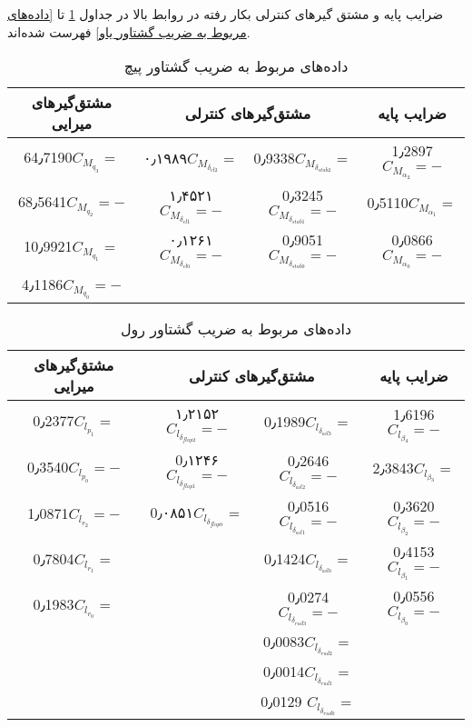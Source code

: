 ضرایب پایه و مشتق گیرهای کنترلی بکار رفته در روابط بالا در جداول \ref{داده‌های مربوط به ضریب گشتاور پیچ} تا  \ref{داده‌های مربوط به ضریب گشتاور یاو} فهرست شده‌اند.
\begin{table}
\centering%
\caption{داده‌های مربوط به ضریب گشتاور پیچ}\label{داده‌های مربوط به ضریب گشتاور پیچ}
\begin{tabular}{ |c|c|c|c| }
  \hline
  مشتق‌گیرهای میرایی & \multicolumn{2}{|c|}{مشتق‌گیرهای کنترلی}  & ضرایب پایه \\ \hline
  64٫7190$C_{M_{q_{3}}}=$ & ۰٫۱۹۸۹$C_{M_{\delta_{el2}}}=$ & 0٫9338$C_{M_{\delta_{stab2}}}=$ & 1٫2897$C_{M_{\alpha_{2}}}= -$\\
  \hline
 68٫5641$C_{M_{q_{2}}}=-$ & ۱٫۴۵۲۱$C_{M_{\delta_{el1}}}=-$ & 0٫3245$C_{M_{\delta_{stab1}}}=-$& 0٫5110$C_{M_{\alpha_{1}}}=$\\
  \hline
10٫9921$C_{M_{q_{1}}}=$& ۰٫۱۲۶۱$C_{M_{\delta_{el0}}}=-$ &0٫9051$C_{M_{\delta_{stab0}}}=-$ &0٫0866$C_{M_{\alpha_{0}}}=- $\\
  \hline
 4٫1186$C_{M_{q_{0}}}=-$& &  & $ $\\
 \hline
 \end{tabular}
\end{table}
\begin{table}
\centering%
\caption{داده‌های مربوط به ضریب گشتاور رول}\label{داده‌های مربوط به ضریب گشتاور رول}
\begin{tabular}{ |c|c|c|c| }
  \hline
  مشتق‌گیرهای میرایی & \multicolumn{2}{|c|}{مشتق‌گیرهای کنترلی}  & ضرایب پایه \\ \hline
 0٫2377$C_{l_{p_{1}}}=$ &  ۱٫۲۱۵۲$C_{l_{\delta_{flap2}}}=-$ &0٫1989$C_{l_{\delta_{ail3}}}=$ & 1٫6196$C_{l_{\beta_{4}}}= -$\\
  \hline
0٫3540$C_{l_{p_{0}}}=-$ & 0٫۱۲۴۶$C_{l_{\delta_{flap1}}}=-$ & 0٫2646$C_{l_{\delta_{ail2}}}=-$& 2٫3843$C_{l_{\beta_{3}}}=$\\
  \hline
1٫0871$C_{l_{r_{2}}}=-$ & 0٫۰۸۵۱$ C_{l_{\delta_{flap0}}}=$ & 0٫0516$C_{l_{\delta_{ail1}}}=-$ & 0٫3620$C_{l_{\beta_{2}}}=- $\\
  \hline
 0٫7804$C_{l_{r_{1}}}=$ & & 0٫1424$ C_{l_{\delta_{ail0}}}=$ & 0٫4153$ C_{l_{\beta_{1}}}=-$\\
 \hline
0٫1983$C_{l_{r_{0}}}=$ &  & 0٫0274$C_{l_{\delta_{rud3}}}=-$ & 0٫0556$C_{l_{\beta_{0}}}=-$\\
   \hline
&  & 0٫0083$ C_{l_{\delta_{rud2}}}=$ & \\
   \hline
&  &0٫0014$C_{l_{\delta_{rud1}}}= $ &\\
 \hline
&  & 0٫0129 $C_{l_{\delta_{rud0}}}= $ & \\
 \hline
 \end{tabular}
\end{table}
